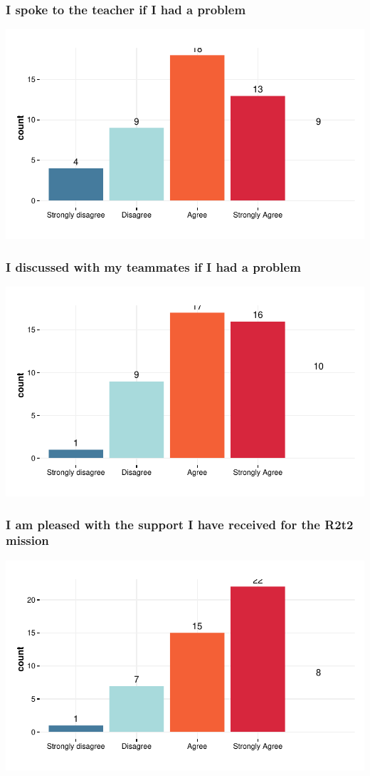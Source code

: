 \documentclass{article}
\begin{document}
\subsubsection{I spoke to the teacher if I had a problem}
\includegraphics{Raw_num/plots/-plot_ask_adult}

\subsubsection{I discussed with my teammates if I had a problem}
\includegraphics{Raw_num/plots/-plot_ask_teamate}

\subsubsection{I am pleased with the support I have received for the R2t2 mission}
\includegraphics{Raw_num/plots/-plot_happy_help}
\end{document}

